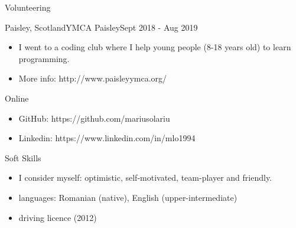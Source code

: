 \documentclass[]{mcdowellcv}
\begin{document}
	\begin{cvsection}{Volunteering}
		\begin{cvsubsection}{Paisley, Scotland}{YMCA Paisley}{Sept 2018 - Aug 2019}
			\begin{itemize}
				\item I went to a coding club where I help young people (8-18 years old) to learn programming. 
				\item More info: http://www.paisleyymca.org/
			\end{itemize}
		\end{cvsubsection}
	\end{cvsection}

	\begin{cvsection}{Online}
		\begin{cvsubsection}{}{}{}
			\begin{itemize}
				\item GitHub: https://github.com/mariusolariu
				\item Linkedin: https://www.linkedin.com/in/mlo1994
			\end{itemize}
		\end{cvsubsection}
	\end{cvsection}

	\begin{cvsection}{Soft Skills}
		\begin{cvsubsection}{}{}{}
			\begin{itemize}
				\item I consider myself: optimistic, self-motivated, team-player and friendly.
				\item languages: Romanian (native), English (upper-intermediate)
				\item driving licence (2012)
			\end{itemize}
		\end{cvsubsection}
	\end{cvsection}
	
\end{document}
